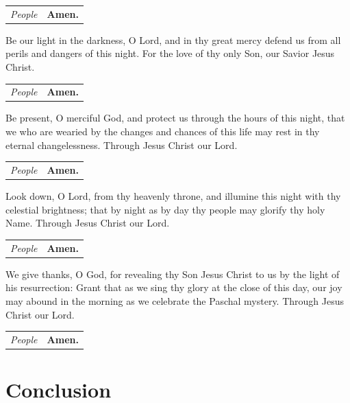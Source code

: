 \documentclass{article}
\begin{document}
\begin{tabularx}{\linewidth}{lX}
  \textit{People} & \textbf{Amen.}
\end{tabularx}


Be our light in the darkness, O Lord, and in thy great mercy defend us from all
perils and dangers of this night. For the love of thy only Son, our Savior
Jesus Christ.

\begin{tabularx}{\linewidth}{lX}
  \textit{People} & \textbf{Amen.}
\end{tabularx}


Be present, O merciful God, and protect us through the hours of this
night, that we who are wearied by the changes and chances of this life
may rest in thy eternal changelessness. Through Jesus Christ our Lord.

\begin{tabularx}{\linewidth}{lX}
  \textit{People} & \textbf{Amen.}
\end{tabularx}


Look down, O Lord, from thy heavenly throne, and illumine this night
with thy celestial brightness; that by night as by day thy people may glorify
thy holy Name. Through Jesus Christ our Lord.

\begin{tabularx}{\linewidth}{lX}
  \textit{People} & \textbf{Amen.}
\end{tabularx}


We give thanks, O God, for revealing thy Son Jesus Christ
to us by the light of his resurrection: Grant that as we sing thy glory
at the close of this day, our joy may abound in the morning as we celebrate
the Paschal mystery. Through Jesus Christ our Lord.

\begin{tabularx}{\linewidth}{lX}
  \textit{People} & \textbf{Amen.}
\end{tabularx}


\section*{Conclusion}
\end{document}
